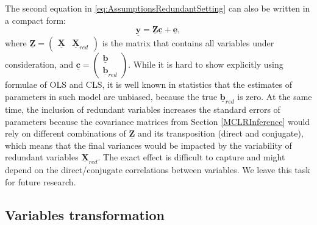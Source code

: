 \documentclass[
]{book}
\begin{document}
The second equation in \eqref{eq:AssumptionsRedundantSetting} can also be written in a compact form:
\begin{equation}
    \underline{\mathbf{y}} = \underline{\mathbf{Z}} \underline{\boldsymbol{c}}  + \underline{\boldsymbol{e}} ,
    \label{eq:AssumptionsRedundantAppliedModel}
\end{equation}
where \(\underline{\mathbf{Z}} = \begin{pmatrix} \underline{\mathbf{X}} & \underline{\mathbf{X}}_{red} \end{pmatrix}\) is the matrix that contains all variables under consideration, and \(\underline{\boldsymbol{c}} = \begin{pmatrix} \underline{\boldsymbol{b}} \\ \underline{\boldsymbol{b}}_{red} \end{pmatrix}\). While it is hard to show explicitly using formulae of OLS and CLS, it is well known in statistics that the estimates of parameters in such model are unbiased, because the true \(\underline{\boldsymbol{b}}_{red}\) is zero. At the same time, the inclusion of redundant variables increases the standard errors of parameters because the covariance matrices from Section \ref{MCLRInference} would rely on different combinations of \(\underline{\mathbf{Z}}\) and its transposition (direct and conjugate), which means that the final variances would be impacted by the variability of redundant variables \(\underline{\mathbf{X}}_{red}\). The exact effect is difficult to capture and might depend on the direct/conjugate correlations between variables. We leave this task for future research.

\hypertarget{assumptionsSpecificationTransformation}{%
\subsection{Variables transformation}\label{assumptionsSpecificationTransformation}}
\end{document}
